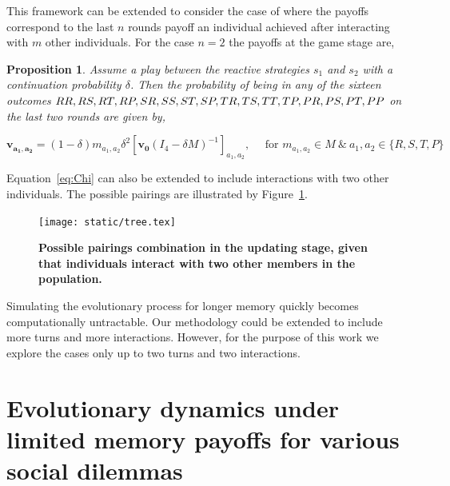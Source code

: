 \documentclass[11pt]{article}
\newcommand{\splitatcommas}[1]{%
  \begingroup
  \begingroup\lccode`~=`, \lowercase{\endgroup
    \edef~{\mathchar\the\mathcode`, \penalty0 \noexpand\hspace{0pt plus 1em}}%
  }\mathcode`,="8000 #1%
  \endgroup
}
\theoremstyle{plainCl1}
\newtheorem{Prop}{Proposition}
\theoremstyle{plainCl2}
\begin{document}
This framework can be extended to consider the case of where the payoffs
correspond to the last \(n\) rounds payoff an individual achieved after
interacting with \(m\) other individuals. For the case \(n=2\) the payoffs
at the game stage are,

\begin{Prop}\label{proposition:last_two_rounds}
Assume a play between the reactive strategies \(s_1\) and \(s_2\) with a
continuation probability \(\delta\). Then the probability of being in any of the
sixteen outcomes \(\splitatcommas{RR, RS, RT, RP, SR, SS, ST, SP, TR, TS, TT, TP, PR, PS, PT, PP}\)
on the last two rounds are given by,

\begin{equation}
  \mathbf{v_{a_1, a_2}} = (1 - \delta) m_{a_1, a_2} \delta^2 \left[\mathbf{v_0}(I_4 - \delta M)^{-1}\right]_{a_1, a_2}, \quad \text{ for } m_{a_1, a_2} \in M \ \& \ a_1, a_2 \in \{R, S, T, P\}
\end{equation}

\end{Prop}

Equation~\ref{eq:Chi} can also be extended to include interactions with two
other individuals. The possible pairings are illustrated by
Figure~\ref{fig:pissible_two_pairs}.

\begin{figure}[!htbp]
  \centering
  \texttt{[image: static/tree.tex]}
  \caption{\textbf{Possible pairings combination in the updating stage, given
  that individuals interact with two other members in the population.}}
  \label{fig:pissible_two_pairs}
\end{figure}

Simulating the evolutionary process for longer memory quickly becomes
computationally untractable. Our methodology could be extended to include more
turns and more interactions. However, for the purpose of this work we explore
the cases only up to two turns and two interactions.


\section{Evolutionary dynamics under limited memory payoffs for various social dilemmas}\label{appendix:further_simulation_results}
\end{document}

